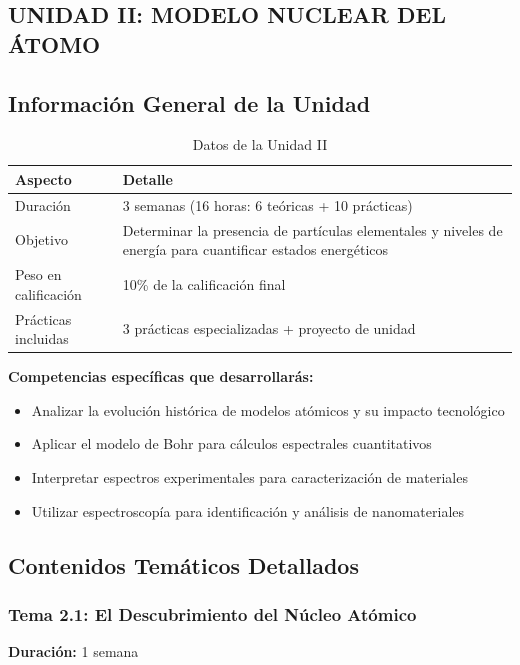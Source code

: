 \begin{tecnologiabox}
\begin{tecnologiabox}
\begin{tecnologiabox}
\begin{teknologiabox}
\chapter{UNIDAD II: MODELO NUCLEAR DEL ÁTOMO}

\section{Información General de la Unidad}

\begin{table}[h]
\centering
\caption{Datos de la Unidad II}
\begin{tabular}{|L{4cm}|L{8cm}|}
\hline
{}
\textbf{Aspecto} & \textbf{Detalle} \\
\hline
Duración & 3 semanas (16 horas: 6 teóricas + 10 prácticas) \\
\hline
Objetivo & Determinar la presencia de partículas elementales y niveles de energía para cuantificar estados energéticos \\
\hline
Peso en calificación & 10\% de la calificación final \\
\hline
Prácticas incluidas & 3 prácticas especializadas + proyecto de unidad \\
\hline
\end{tabular}
\end{table}

\begin{objetivobox}
\textbf{Competencias específicas que desarrollarás:}
\begin{itemize}
\item Analizar la evolución histórica de modelos atómicos y su impacto tecnológico
\item Aplicar el modelo de Bohr para cálculos espectrales cuantitativos
\item Interpretar espectros experimentales para caracterización de materiales
\item Utilizar espectroscopía para identificación y análisis de nanomateriales
\end{itemize}
\end{objetivobox}

\section{Contenidos Temáticos Detallados}

\subsection{Tema 2.1: El Descubrimiento del Núcleo Atómico}
\textbf{Duración:} 1 semana


\end{teknologiabox}
\end{tecnologiabox}
\end{tecnologiabox}
\end{tecnologiabox}
